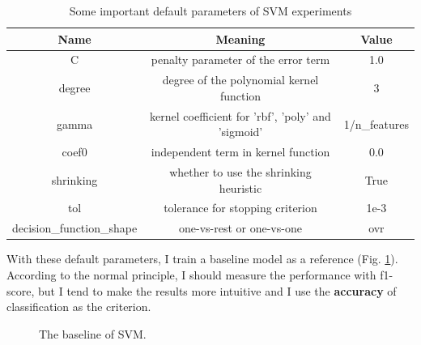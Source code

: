 \documentclass[12pt,a4paper]{article}
\theoremstyle{definition}
\begin{document}
\begin{table}[H]
	\renewcommand\arraystretch{1.35}
	\caption{Some important default parameters of SVM experiments}
	\label{tab:default-para}
	\centering
	
	\begin{tabular}{c|c|c}
		\centering
		Name & Meaning & Value \\
		\hline
		\hline
		
		C & penalty parameter of the error term & 1.0 \\
		degree & degree of the polynomial kernel function & 3 \\
		gamma & kernel coefficient for 'rbf', 'poly' and 'sigmoid' & 1/n\_features \\
		coef0 & independent term in kernel function & 0.0 \\
		shrinking & whether to use the shrinking heuristic & True \\
		tol & tolerance for stopping criterion & 1e-3 \\
		decision\_function\_shape & one-vs-rest or one-vs-one & ovr \\
		
	\end{tabular}
\end{table}

With these default parameters, I train a baseline model as a reference (Fig. \ref{fig:svm-baseline}). According to the normal principle, I should measure the performance with f1-score, but I tend to make the results more intuitive and I use the \textbf{accuracy} of classification as the criterion.

\begin{figure}[H]
	\centering
	\caption{The baseline of SVM.}
	\label{fig:svm-baseline}
\end{figure}
\end{document}
